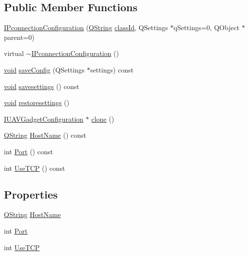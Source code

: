 \subsection*{\-Public \-Member \-Functions}
\begin{DoxyCompactItemize}
\item 
\hyperlink{group___i_p_conn_plugin_ga0ace87181ef54adf63c246bcfa013840}{\-I\-Pconnection\-Configuration} (\hyperlink{group___u_a_v_objects_plugin_gab9d252f49c333c94a72f97ce3105a32d}{\-Q\-String} \hyperlink{group___core_plugin_gac953657221ba7fda967ada0408332641}{class\-Id}, \-Q\-Settings $\ast$q\-Settings=0, \-Q\-Object $\ast$parent=0)
\item 
virtual \hyperlink{group___i_p_conn_plugin_ga9c8548dfb0fd37208686bb5d037dfce4}{$\sim$\-I\-Pconnection\-Configuration} ()
\item 
\hyperlink{group___u_a_v_objects_plugin_ga444cf2ff3f0ecbe028adce838d373f5c}{void} \hyperlink{group___i_p_conn_plugin_ga65bf62eee71070aef5ce1f9fe1f24322}{save\-Config} (\-Q\-Settings $\ast$settings) const 
\item 
\hyperlink{group___u_a_v_objects_plugin_ga444cf2ff3f0ecbe028adce838d373f5c}{void} \hyperlink{group___i_p_conn_plugin_ga6e5d554b42d69fd06e4817ec4bece987}{savesettings} () const 
\item 
\hyperlink{group___u_a_v_objects_plugin_ga444cf2ff3f0ecbe028adce838d373f5c}{void} \hyperlink{group___i_p_conn_plugin_gabd3e5ffc6975c4ef5389faaf21fb55c0}{restoresettings} ()
\item 
\hyperlink{group___core_plugin_gacdfdf0b1e39b5002472b76b6564ce51f}{\-I\-U\-A\-V\-Gadget\-Configuration} $\ast$ \hyperlink{group___i_p_conn_plugin_gaf970300a500acc18095f6d50a3926529}{clone} ()
\item 
\hyperlink{group___u_a_v_objects_plugin_gab9d252f49c333c94a72f97ce3105a32d}{\-Q\-String} \hyperlink{group___i_p_conn_plugin_gad855d70f2d3eee8910ee94c261e9f3cb}{\-Host\-Name} () const 
\item 
int \hyperlink{group___i_p_conn_plugin_gaaa57ca41a00de517e859afa3c339099a}{\-Port} () const 
\item 
int \hyperlink{group___i_p_conn_plugin_ga584108a558af4b69e0494772eb273f94}{\-Use\-T\-C\-P} () const 
\end{DoxyCompactItemize}
\subsection*{\-Properties}
\begin{DoxyCompactItemize}
\item 
\hyperlink{group___u_a_v_objects_plugin_gab9d252f49c333c94a72f97ce3105a32d}{\-Q\-String} \hyperlink{group___i_p_conn_plugin_gaa540a20af79b7ec845405fb81a75dd82}{\-Host\-Name}
\item 
int \hyperlink{group___i_p_conn_plugin_ga016b44f60ba95951cdf428d88a119a97}{\-Port}
\item 
int \hyperlink{group___i_p_conn_plugin_ga40b7a131ca4ee4e1c315a0fc12281da8}{\-Use\-T\-C\-P}
\end{DoxyCompactItemize}


